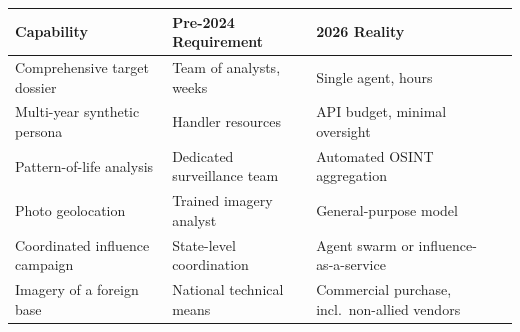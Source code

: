 \documentclass[11pt,letterpaper]{article}
\begin{document}
\begin{keybox}
\end{keybox}

\begin{warnbox}
\begin{center}
\footnotesize
\begin{tabularx}{\linewidth}{ZY{0.91}Y{0.96}Y{1.13}}
\toprule
\textbf{Capability} & \textbf{Pre-2024 Requirement} & \textbf{2026 Reality} \\
\midrule
Comprehensive target dossier & Team of analysts, weeks & Single agent, hours \\
Multi-year synthetic persona & Handler resources & API budget, minimal oversight \\
Pattern-of-life analysis & Dedicated surveillance team & Automated OSINT aggregation \\
Photo geolocation & Trained imagery analyst & General-purpose model \\
Coordinated influence campaign & State-level coordination & Agent swarm or influence-as-a-service \\
Imagery of a foreign base & National technical means & Commercial purchase, incl.\ non-allied vendors \\
\bottomrule
\end{tabularx}
\end{center}
\end{warnbox}
\end{document}
